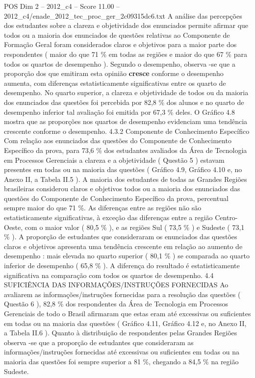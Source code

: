\begin{textsample}{POS Dim 2 – 2012\_c4 – Score 11.00 – 2012\_c4/enade\_2012\_tec\_proc\_ger\_2c09315dc6.txt}
A análise das percepções dos estudantes sobre a clareza e objetividade dos enunciados permite afirmar que todos ou a maioria dos enunciados de questões relativas ao Componente de Formação Geral foram considerados claros e objetivos para a maior parte dos respondentes ( maior do que 71 \% em todas as regiões e maior do que 67 \% para todos os quartos de desempenho ).
Segundo o desempenho, observa -se que a proporção dos que emitiram esta opinião \textbf{cresce} conforme o desempenho aumenta, com diferenças estatisticamente significativas entre os quarto de desempenho.
No quarto superior, a clareza e objetividade de todos ou da maioria dos enunciados das questões foi percebida por 82,8 \% dos alunos e no quarto de desempenho inferior tal avaliação foi emitida por 67,3 \% deles.
O Gráfico 4.8 mostra que as proporções nos quartos de desempenho evidenciam uma tendência crescente conforme o desempenho. 4.3.2 Componente de Conhecimento Específico Com relação aos enunciados das questões do Componente de Conhecimento Específico da prova, para 73,6 \% dos estudantes avaliados da Área de Tecnologia em Processos Gerenciais a clareza e a objetividade ( Questão 5 ) estavam presentes em todas ou na maioria das questões ( Gráfico 4.9, Gráfico 4.10 e, no Anexo II, a Tabela II.5 ).
A maioria dos estudantes de todas as Grandes Regiões brasileiras considerou claros e objetivos todos ou a maioria dos enunciados das questões do Componente de Conhecimento Específico da prova, percentual sempre maior do que 71 \%.
As diferenças entre as regiões não são estatisticamente significativas, à exceção das diferenças entre a região Centro-Oeste, com o maior valor ( 80,5 \% ), e as regiões Sul ( 73,5 \% ) e Sudeste ( 73,1 \% ).
A proporção de estudantes que consideraram os enunciados das questões claros e objetivos apresenta uma tendência crescente em relação ao aumento de desempenho : mais elevada no quarto superior ( 80,1 \% ) se comparada ao quarto inferior de desempenho ( 65,8 \% ).
A diferença do resultado é estatisticamente significativa na comparação com todos os quartos de desempenho. 4.4 SUFICIÊNCIA DAS INFORMAÇÕES/INSTRUÇÕES FORNECIDAS Ao avaliarem as informações/instruções fornecidas para a resolução das questões ( Questão 6 ), 82,8 \% dos respondentes da Área de Tecnologia em Processos Gerenciais de todo o Brasil afirmaram que estas eram até excessivas ou suficientes em todas ou na maioria das questões ( Gráfico 4.11, Gráfico 4.12 e, no Anexo II, a Tabela II.6 ).
Quanto à distribuição de respondentes pelas Grandes Regiões observa -se que a proporção de estudantes que consideraram as informações/instruções fornecidas até excessivas ou suficientes em todas ou na maioria das questões foi sempre superior a 81 \%, chegando a 84,5 \% na região Sudeste.

\end{textsample}
